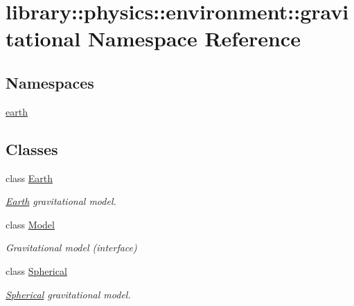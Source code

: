 \hypertarget{namespacelibrary_1_1physics_1_1environment_1_1gravitational}{}\section{library\+:\+:physics\+:\+:environment\+:\+:gravitational Namespace Reference}
\label{namespacelibrary_1_1physics_1_1environment_1_1gravitational}
\subsection*{Namespaces}
\begin{DoxyCompactItemize}
\item 
 \hyperlink{namespacelibrary_1_1physics_1_1environment_1_1gravitational_1_1earth}{earth}
\end{DoxyCompactItemize}
\subsection*{Classes}
\begin{DoxyCompactItemize}
\item 
class \hyperlink{classlibrary_1_1physics_1_1environment_1_1gravitational_1_1_earth}{Earth}
\begin{DoxyCompactList}\small\item\em \hyperlink{classlibrary_1_1physics_1_1environment_1_1gravitational_1_1_earth}{Earth} gravitational model. \end{DoxyCompactList}\item 
class \hyperlink{classlibrary_1_1physics_1_1environment_1_1gravitational_1_1_model}{Model}
\begin{DoxyCompactList}\small\item\em Gravitational model (interface) \end{DoxyCompactList}\item 
class \hyperlink{classlibrary_1_1physics_1_1environment_1_1gravitational_1_1_spherical}{Spherical}
\begin{DoxyCompactList}\small\item\em \hyperlink{classlibrary_1_1physics_1_1environment_1_1gravitational_1_1_spherical}{Spherical} gravitational model. \end{DoxyCompactList}\end{DoxyCompactItemize}
